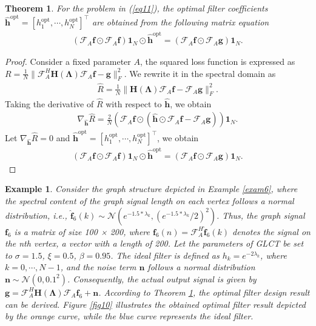 \documentclass[lettersize,journal]{IEEEtran}
\newtheorem{example}{Example}
\newtheorem{thm}{Theorem}
\begin{document}
\begin{thm} \label{thm2}
	For the problem in (\ref{eq11}), the optimal filter coefficients $\mathbf{\hat{h}}^{\text{opt}}=[h_1^{\text{opt}},\cdots, h_N^{\text{opt}}]^{\top}$ are obtained from the following matrix equation
	\begin{align}
		(\mathcal{F}_{A} \mathbf{f} \odot \mathcal{F}_{A} \mathbf{f}) \mathbf{1}_N \odot  \mathbf{\hat{h}}^{\text{opt}} = (\mathcal{F}_{A} \mathbf{f} \odot  \mathcal{F}_{A} \mathbf{g}) \mathbf{1}_N.
	\end{align}
\end{thm}
\begin{proof}
	Consider a fixed parameter $A$, the squared loss function is expressed as
	$R = \frac{1}{N} \|\mathcal{F}_{A}^H \mathbf{H}(\boldsymbol{\Lambda}) \mathcal{F}_{A} \mathbf{f} - \mathbf{g}\|_F^2$.
	We rewrite it in the spectral domain as
	\begin{align} \label{eq16}
		\hat{R} = \frac{1}{N} \|\mathbf{H}(\boldsymbol{\Lambda}) \mathcal{F}_{A} \mathbf{f} -  \mathcal{F}_{A}\mathbf{g}\|_F^2.
	\end{align}
	Taking the derivative of $\hat{R}$ with respect to $\mathbf{\hat{h}}$, we obtain
	\begin{align}
		\nabla_{\mathbf{\hat{h}}} \hat{R} = \frac{2}{N} \left(\mathcal{F}_{A} \mathbf{f} \odot (\mathbf{\hat{h}} \odot \mathcal{F}_{A} \mathbf{f} - \mathcal{F}_{A} \mathbf{g} ) \right) \mathbf{1}_N.
	\end{align}
	Let $\nabla_{\mathbf{\hat{h}}} \hat{R} = 0$ and $\mathbf{\hat{h}}^{\text{opt}}=[h_1^{\text{opt}},\cdots, h_N^{\text{opt}}]^{\top}$, we obtain
	\begin{align}
		(\mathcal{F}_{A} \mathbf{f} \odot \mathcal{F}_{A} \mathbf{f}) \mathbf{1}_N \odot  \mathbf{\hat{h}}^{\text{opt}} = (\mathcal{F}_{A}\mathbf{f} \odot  \mathcal{F}_{A} \mathbf{g}) \mathbf{1}_N.
	\end{align}
\end{proof}

\begin{example} \label{exam7}
	Consider the graph structure depicted in Example \ref{exam6}, where the spectral content of the graph signal length on each vertex follows a normal distribution, i.e., $\mathbf{\hat{f}}_6(k) \sim \mathcal{N}(e^{-1.5*\lambda_k}, (e^{-1.5*\lambda_k}/2)^2)$. Thus, the graph signal $\mathbf{f}_6$ is a matrix of size 100 × 200, where $\mathbf{f}_6(n)=\mathcal{F}_{A}^H\mathbf{\hat{f}}_6(k)$ denotes the signal on the nth vertex, a vector with a length of 200.
	Let the parameters of GLCT be set to $\sigma=1.5$, $\xi=0.5$, $\beta=0.95$. The ideal filter is defined as $h_k=e^{-2 \lambda_k}$, where $k=0,\cdots,N-1$, and the noise term $\mathbf{n}$ follows a normal distribution $\mathbf{n} \sim \mathcal{N}(0, 0.1^2)$. Consequently, the actual output signal is given by $\mathbf{g}=\mathcal{F}_{A}^H \mathbf{H(\Lambda)} \mathcal{F}_{A} \mathbf{f}_6+\mathbf{n}$.
	According to Theorem \ref{thm2}, the optimal filter design result can be derived. Figure \ref{fig10} illustrates the obtained optimal filter result depicted by the orange curve, while the blue curve represents the ideal filter.
\end{example}
\end{document}
